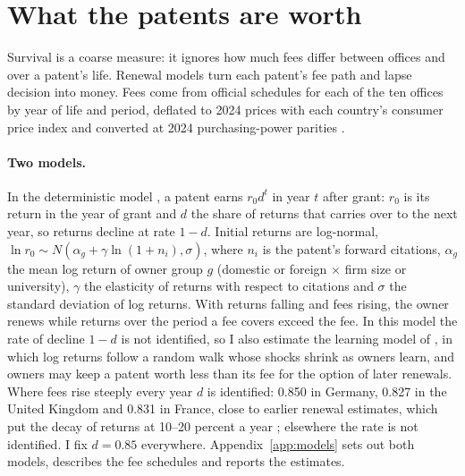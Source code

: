 \section{What the patents are worth}\label{sec:values}

Survival is a coarse measure: it ignores how much fees differ between offices and over a patent's life. Renewal
models turn each patent's fee path and lapse decision into money. Fees come from official schedules for each of the
ten offices by year of life and period, deflated to 2024 prices with each country's consumer price index and
converted at 2024 purchasing-power parities \citep{WDI}.

\paragraph{Two models.} In the deterministic model \citep{SchankermanPakes1986}, a patent earns $r_0 d^t$ in year $t$
after grant: $r_0$ is its return in the year of grant and $d$ the share of returns that carries over to the next
year, so returns decline at rate $1-d$. Initial returns are log-normal, $\ln r_0 \sim N(\alpha_g + \gamma \ln(1+n_i),
\sigma)$, where $n_i$ is the patent's forward citations, $\alpha_g$ the mean log return of owner group $g$
(domestic or foreign $\times$ firm size or university), $\gamma$ the elasticity of returns with respect to citations
and $\sigma$ the standard deviation of log returns. With returns falling and fees rising, the owner renews while
returns over the period a fee covers exceed the fee. In this model the rate of decline $1-d$ is not identified, so I also estimate the
learning model of \citet{Pakes1986}, in which log returns follow a random walk whose shocks shrink as owners learn,
and owners may keep a patent worth less than its fee for the option of later renewals. Where fees rise steeply every year $d$ is identified: 0.850 in Germany, 0.827 in the United Kingdom
and 0.831 in France, close to earlier renewal estimates, which put the decay of returns at 10--20 percent a
year \citep{SchankermanPakes1986,Griliches1990}; elsewhere the rate is not identified. I fix $d = 0.85$ everywhere. Appendix~\ref{app:models} sets out both models, describes the fee schedules and reports the estimates.

